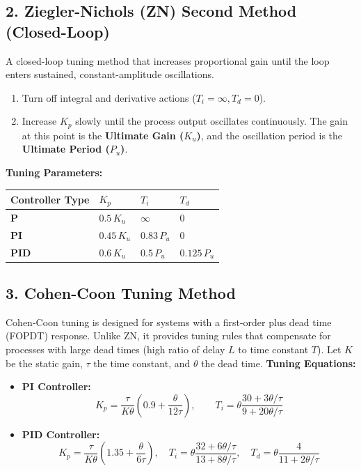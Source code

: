 \documentclass[12pt,a4paper]{article}
\begin{document}
\subsection{2. Ziegler-Nichols (ZN) Second Method (Closed-Loop)}
A closed-loop tuning method that increases proportional gain until the loop enters sustained, constant-amplitude oscillations.
\begin{enumerate}[label=\textbf{\arabic*.}, leftmargin=*]
  \item Turn off integral and derivative actions ($T_i = \infty, T_d = 0$).
  \item Increase $K_p$ slowly until the process output oscillates continuously. The gain at this point is the \textbf{Ultimate Gain ($K_u$)}, and the oscillation period is the \textbf{Ultimate Period ($P_u$)}.
\end{enumerate}

\textbf{Tuning Parameters:}
  \begin{center}
  \small
  \begin{tabularx}{0.85\linewidth}{|B{3.0cm}|Y|Y|Y|}
  \hline
  \textbf{Controller Type} & $K_p$ & $T_i$ & $T_d$ \\ \hline
  \textbf{P} & $0.5\,K_u$ & $\infty$ & $0$ \\ \hline
  \textbf{PI} & $0.45\,K_u$ & $0.83\,P_u$ & $0$ \\ \hline
  \textbf{PID} & $0.6\,K_u$ & $0.5\,P_u$ & $0.125\,P_u$ \\ \hline
  \end{tabularx}
  \end{center}

\subsection{3. Cohen-Coon Tuning Method}
Cohen-Coon tuning is designed for systems with a first-order plus dead time (FOPDT) response. Unlike ZN, it provides tuning rules that compensate for processes with large dead times (high ratio of delay $L$ to time constant $T$).
Let $K$ be the static gain, $\tau$ the time constant, and $\theta$ the dead time.
\textbf{Tuning Equations:}
  \begin{itemize}[leftmargin=*, itemsep=3.5pt]
    \item \textbf{PI Controller:}
      \[
      K_p = \frac{\tau}{K\theta} \left( 0.9 + \frac{\theta}{12\tau} \right), \qquad T_i = \theta \frac{30 + 3\theta/\tau}{9 + 20\theta/\tau}
      \]
    \item \textbf{PID Controller:}
      \[
      K_p = \frac{\tau}{K\theta} \left( 1.35 + \frac{\theta}{6\tau} \right), \quad T_i = \theta \frac{32 + 6\theta/\tau}{13 + 8\theta/\tau}, \quad T_d = \theta \frac{4}{11 + 2\theta/\tau}
      \]
  \end{itemize}
\end{document}
